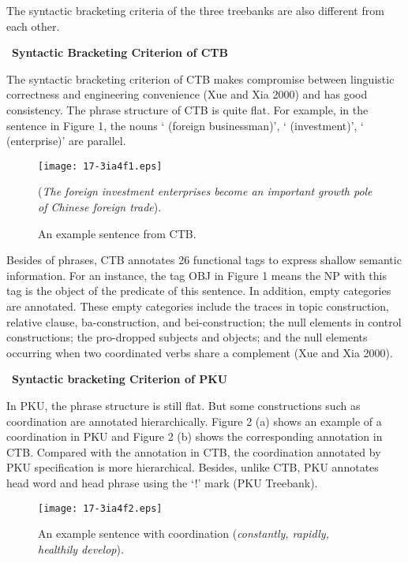 \documentclass[english]{jnlp_1.4}
\begin{document}
The syntactic bracketing criteria of the three treebanks are also different 
from each other. 

\noindent
\textbullet\ \textbf{Syntactic Bracketing Criterion of CTB}

The syntactic bracketing criterion of CTB makes compromise between 
linguistic correctness and engineering convenience (Xue and Xia 2000) and 
has good consistency. The phrase structure of CTB is quite flat. For 
example, in the sentence in Figure 1, the nouns 
` (foreign businessman)', ` (investment)', 
` (enterprise)' are parallel. 

\begin{figure}[b]
\begin{center}
\texttt{[image: 17-3ia4f1.eps]}
\end{center}
\caption{An example sentence from CTB.} 
\begin{center}
(\textit{The foreign investment enterprises become an important growth pole of Chinese foreign trade}).
\end{center}
\end{figure}

Besides of phrases, CTB annotates 26 functional tags to express shallow 
semantic information. For an instance, the tag OBJ in Figure 1 means the NP 
with this tag is the object of the predicate of this sentence. In addition, 
empty categories are annotated. These empty categories include the traces in 
topic construction, relative clause, ba-construction, and bei-construction; 
the null elements in control constructions; the pro-dropped subjects and 
objects; and the null elements occurring when two coordinated verbs share a 
complement (Xue and Xia 2000).


\noindent
\textbullet\ \textbf{Syntactic bracketing Criterion of PKU}

In PKU, the phrase structure is still flat. But some constructions such as 
coordination are annotated hierarchically. Figure 2 (a) shows an example of 
a coordination in PKU and Figure 2 (b) shows the corresponding annotation in 
CTB. Compared with the annotation in CTB, the coordination annotated by PKU 
specification is more hierarchical. Besides, unlike CTB, PKU annotates head 
word and head phrase using the `!' mark (PKU Treebank).


\begin{figure}[t]
\begin{center}
\texttt{[image: 17-3ia4f2.eps]}
\end{center}
\caption{An example sentence with coordination (\textit{constantly, rapidly, healthily develop}).} 
\end{figure}
\end{document}
